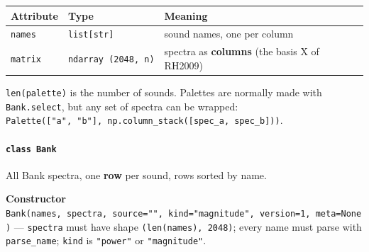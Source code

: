 \documentclass[
  10pt,
]{article}
\begin{document}
\begin{longtable}[]{@{}lll@{}}
\toprule
\begin{minipage}[b]{0.30\columnwidth}\raggedright
Attribute\strut
\end{minipage} &
\begin{minipage}[b]{0.30\columnwidth}\raggedright
Type\strut
\end{minipage} &
\begin{minipage}[b]{0.30\columnwidth}\raggedright
Meaning\strut
\end{minipage}\tabularnewline
\midrule
\endhead
\begin{minipage}[t]{0.30\columnwidth}\raggedright
\texttt{names}\strut
\end{minipage} &
\begin{minipage}[t]{0.30\columnwidth}\raggedright
\texttt{list{[}str{]}}\strut
\end{minipage} &
\begin{minipage}[t]{0.30\columnwidth}\raggedright
sound names, one per column\strut
\end{minipage}\tabularnewline
\begin{minipage}[t]{0.30\columnwidth}\raggedright
\texttt{matrix}\strut
\end{minipage} &
\begin{minipage}[t]{0.30\columnwidth}\raggedright
\texttt{ndarray\ (2048,\ n)}\strut
\end{minipage} &
\begin{minipage}[t]{0.30\columnwidth}\raggedright
spectra as \textbf{columns} (the basis X of RH2009)\strut
\end{minipage}\tabularnewline
\bottomrule
\end{longtable}

\texttt{len(palette)} is the number of sounds. Palettes are
normally made with \texttt{Bank.select}, but any set of
spectra can be wrapped:
\texttt{Palette({[}"a",\ "b"{]},\ np.column\_stack({[}spec\_a,\ spec\_b{]}))}.

\paragraph{\texorpdfstring{\texttt{class\ Bank}}{class Bank}}

All Bank spectra, one \textbf{row} per sound, rows sorted by
name.

\textbf{Constructor}
\texttt{Bank(names,\ spectra,\ source="",\ kind="magnitude",\ version=1,\ meta=None)}
--- \texttt{spectra} must have shape
\texttt{(len(names),\ 2048)}; every name must parse with
\texttt{parse\_name}; \texttt{kind} is \texttt{"power"} or
\texttt{"magnitude"}.
\end{document}
